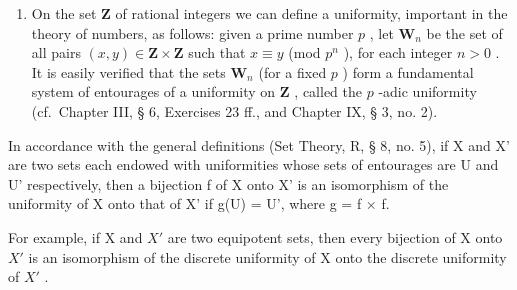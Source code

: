 \begin{enumerate}
\def\labelenumi{\arabic{enumi})}
\setcounter{enumi}{2}
\tightlist
\item
  On the set \(\mathbf{Z}\) of rational integers we can define a uniformity, important in the theory of numbers, as follows: given a prime number \(p\) , let \(\mathbf{W}_n\) be the set of all pairs \((x,y)\in \mathbf{Z}\times \mathbf{Z}\) such that \(x\equiv y\) (mod \(p^n\) ), for each integer \(n > 0\) . It is easily verified that the sets \(\mathbf{W}_n\) (for a fixed \(p\) ) form a fundamental system of entourages of a uniformity on \(\mathbf{Z}\) , called the \(p\) -adic uniformity (cf.~Chapter III, § 6, Exercises 23 ff., and Chapter IX, § 3, no. 2).
\end{enumerate}

In accordance with the general definitions (Set Theory, R, § 8, no. 5), if X and X' are two sets each endowed with uniformities whose sets of entourages are U and U' respectively, then a bijection f of X onto X' is an isomorphism of the uniformity of X onto that of X' if g(U) = U', where g = f × f.

For example, if X and \(X'\) are two equipotent sets, then every bijection of X onto \(X'\) is an isomorphism of the discrete uniformity of X onto the discrete uniformity of \(X'\) .

